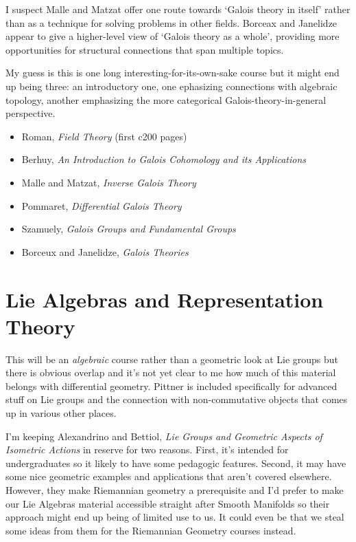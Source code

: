 \documentclass[article]{article}
\begin{document}
I suspect Malle and Matzat offer one route towards `Galois theory in itself' rather than as a technique for solving problems in other fields. Borceax and Janelidze appear to give a higher-level view of `Galois theory as a whole', providing more opportunities for structural connections that span multiple topics.

My guess is this is one long interesting-for-its-own-sake course but it might end up being three: an introductory one, one ephasizing connections with algebraic topology, another emphasizing the more categorical Galois-theory-in-general perspective.

\begin{itemize}
	\item[]{Roman, \textit{Field Theory} (first c200 pages)}
	\item[]{Berhuy, \textit{An Introduction to Galois Cohomology and its Applications}}
	\item[]{Malle and Matzat, \textit{Inverse Galois Theory}}
	\item[]{Pommaret, \textit{Differential Galois Theory}}
	\item[]{Szamuely, \textit{Galois Groups and Fundamental Groups}}
	\item[]{Borceux and Janelidze, \textit{Galois Theories}}
\end{itemize}

\section{Lie Algebras and Representation Theory}

This will be an \textit{algebraic} course rather than a geometric look at Lie groups but there is obvious overlap and it's not yet clear to me how much of this material belongs with differential geometry. Pittner is included specifically for advanced stuff on Lie groups and the connection with non-commutative objects that comes up in various other places.

I'm keeping Alexandrino and Bettiol, \textit{Lie Groups and Geometric Aspects of Isometric Actions} in reserve for two reasons. First, it's intended for undergraduates so it likely to have some pedagogic features. Second, it may have some nice geometric examples and applications that aren't covered elsewhere. However, they make Riemannian geometry a prerequisite and I'd prefer to make our Lie Algebras material accessible straight after Smooth Manifolds so their approach might end up being of limited use to us. It could even be that we steal some ideas from them for the Riemannian Geometry courses instead.
\end{document}

